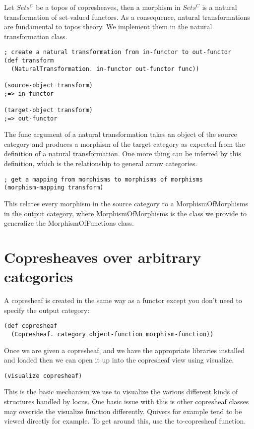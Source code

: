 \documentclass[a4paper,11pt]{report}
\begin{document}
Let $Sets^C$ be a topos of copresheaves, then a morphism in $Sets^C$ is a natural transformation of set-valued functors. As a consequence, natural transformations are fundamental to topos theory. We implement them in the natural transformation class.

\begin{lstlisting}
; create a natural transformation from in-functor to out-functor
(def transform 
  (NaturalTransformation. in-functor out-functor func))

(source-object transform)
;=> in-functor 

(target-object transform)
;=> out-functor
\end{lstlisting}

The func argument of a natural transformation takes an object of the source category and produces a morphism of the target category as expected from the definition of a natural transformation. One more thing can be inferred by this definition, which is the relationship to general arrow categories. 

\begin{lstlisting}
; get a mapping from morphisms to morphisms of morphisms
(morphism-mapping transform)
\end{lstlisting}

This relates every morphism in the source category to a MorphismOfMorphisms in the output category, where MorphismOfMorphisms is the class we provide to generalize the MorphismOfFunctions class.

\newpage 
\section{Copresheaves over arbitrary categories}
A copresheaf is created in the same way as a functor except you don't need to specify the output category:

\begin{lstlisting}
(def copresheaf 
  (Copresheaf. category object-function morphism-function))
\end{lstlisting}

Once we are given a copresheaf, and we have the appropriate libraries installed and loaded then we can open it up into the copresheaf view using visualize.

\begin{lstlisting}
(visualize copresheaf)
\end{lstlisting}

This is the basic mechanism we use to visualize the various different kinds of structures handled by locus. One basic issue with this is other copresheaf classes may override the visualize function differently. Quivers for example tend to be viewed directly for example. To get around this, use the to-copresheaf function.
\end{document}
